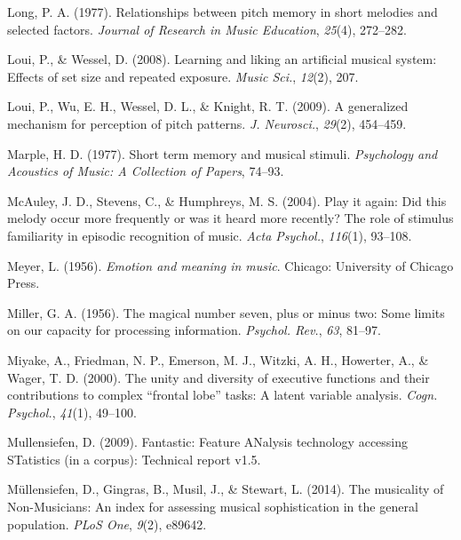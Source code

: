 \documentclass[english,man,floatsintext]{apa6}
\begin{document}
\leavevmode\hypertarget{ref-Long1977-re}{}%
Long, P. A. (1977). Relationships between pitch memory in short melodies and selected factors. \emph{Journal of Research in Music Education}, \emph{25}(4), 272--282.

\leavevmode\hypertarget{ref-Loui2008-zy}{}%
Loui, P., \& Wessel, D. (2008). Learning and liking an artificial musical system: Effects of set size and repeated exposure. \emph{Music Sci.}, \emph{12}(2), 207.

\leavevmode\hypertarget{ref-Loui2009-sr}{}%
Loui, P., Wu, E. H., Wessel, D. L., \& Knight, R. T. (2009). A generalized mechanism for perception of pitch patterns. \emph{J. Neurosci.}, \emph{29}(2), 454--459.

\leavevmode\hypertarget{ref-Marple1977-pm}{}%
Marple, H. D. (1977). Short term memory and musical stimuli. \emph{Psychology and Acoustics of Music: A Collection of Papers}, 74--93.

\leavevmode\hypertarget{ref-McAuley2004-eq}{}%
McAuley, J. D., Stevens, C., \& Humphreys, M. S. (2004). Play it again: Did this melody occur more frequently or was it heard more recently? The role of stimulus familiarity in episodic recognition of music. \emph{Acta Psychol.}, \emph{116}(1), 93--108.

\leavevmode\hypertarget{ref-Meyer1956-gc}{}%
Meyer, L. (1956). \emph{Emotion and meaning in music}. Chicago: University of Chicago Press.

\leavevmode\hypertarget{ref-Miller1956-np}{}%
Miller, G. A. (1956). The magical number seven, plus or minus two: Some limits on our capacity for processing information. \emph{Psychol. Rev.}, \emph{63}, 81--97.

\leavevmode\hypertarget{ref-Miyake2000-mh}{}%
Miyake, A., Friedman, N. P., Emerson, M. J., Witzki, A. H., Howerter, A., \& Wager, T. D. (2000). The unity and diversity of executive functions and their contributions to complex ``frontal lobe'' tasks: A latent variable analysis. \emph{Cogn. Psychol.}, \emph{41}(1), 49--100.

\leavevmode\hypertarget{ref-Mullensiefen2009-dx}{}%
Mullensiefen, D. (2009). Fantastic: Feature ANalysis technology accessing STatistics (in a corpus): Technical report v1.5.

\leavevmode\hypertarget{ref-Mullensiefen2014-kl}{}%
Müllensiefen, D., Gingras, B., Musil, J., \& Stewart, L. (2014). The musicality of Non-Musicians: An index for assessing musical sophistication in the general population. \emph{PLoS One}, \emph{9}(2), e89642.
\end{document}
